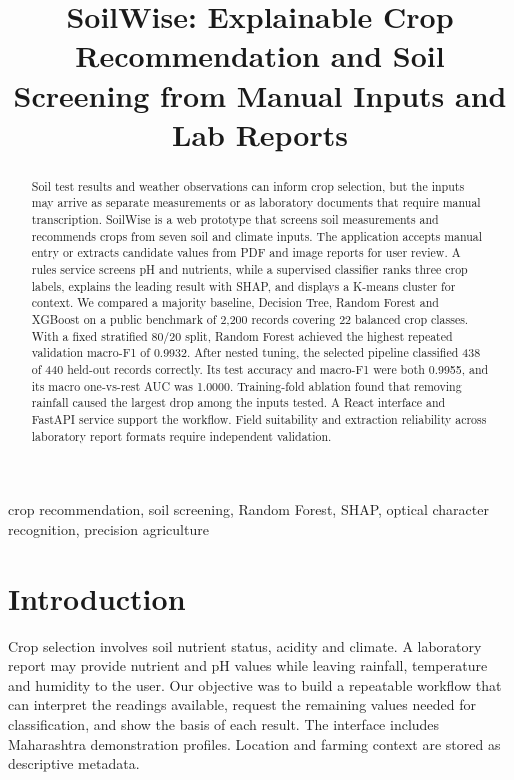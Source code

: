 \documentclass[conference]{IEEEtran}
\title{SoilWise: Explainable Crop Recommendation and Soil Screening from Manual Inputs and Lab Reports}
\author{\IEEEauthorblockN{\studentname}
\IEEEauthorblockA{\department\\\studentemail}}
\begin{document}
\maketitle

\begin{abstract}
Soil test results and weather observations can inform crop selection, but the inputs may arrive as separate measurements or as laboratory documents that require manual transcription. SoilWise is a web prototype that screens soil measurements and recommends crops from seven soil and climate inputs. The application accepts manual entry or extracts candidate values from PDF and image reports for user review. A rules service screens pH and nutrients, while a supervised classifier ranks three crop labels, explains the leading result with SHAP, and displays a K-means cluster for context. We compared a majority baseline, Decision Tree, Random Forest and XGBoost on a public benchmark of 2,200 records covering 22 balanced crop classes. With a fixed stratified 80/20 split, Random Forest achieved the highest repeated validation macro-F1 of 0.9932. After nested tuning, the selected pipeline classified 438 of 440 held-out records correctly. Its test accuracy and macro-F1 were both 0.9955, and its macro one-vs-rest AUC was 1.0000. Training-fold ablation found that removing rainfall caused the largest drop among the inputs tested. A React interface and FastAPI service support the workflow. Field suitability and extraction reliability across laboratory report formats require independent validation.
\end{abstract}

\begin{IEEEkeywords}
crop recommendation, soil screening, Random Forest, SHAP, optical character recognition, precision agriculture
\end{IEEEkeywords}

\section{Introduction}
Crop selection involves soil nutrient status, acidity and climate. A laboratory report may provide nutrient and pH values while leaving rainfall, temperature and humidity to the user. Our objective was to build a repeatable workflow that can interpret the readings available, request the remaining values needed for classification, and show the basis of each result. The interface includes Maharashtra demonstration profiles. Location and farming context are stored as descriptive metadata.
\end{document}
